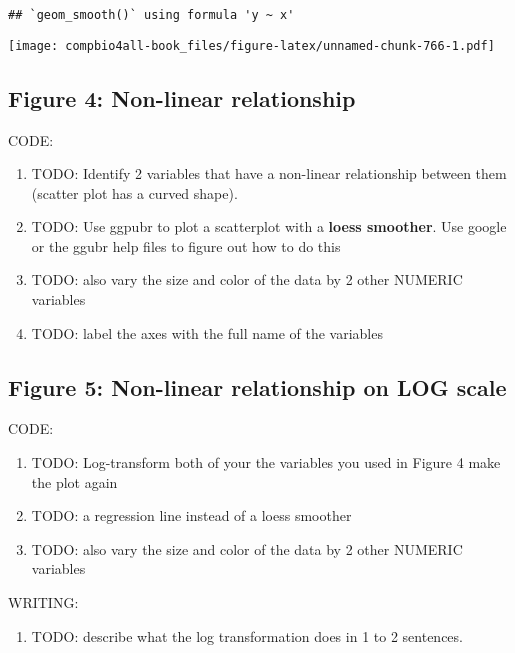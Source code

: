 \documentclass[
]{book}
\providecommand{\tightlist}{%
  \setlength{\itemsep}{0pt}\setlength{\parskip}{0pt}}
\begin{document}
\begin{verbatim}
## `geom_smooth()` using formula 'y ~ x'
\end{verbatim}

\texttt{[image: compbio4all-book\_files/figure-latex/unnamed-chunk-766-1.pdf]}

\hypertarget{figure-4-non-linear-relationship}{%
\subsection{Figure 4: Non-linear relationship}\label{figure-4-non-linear-relationship}}

CODE:

\begin{enumerate}
\def\labelenumi{\arabic{enumi}.}
\tightlist
\item
  TODO: Identify 2 variables that have a non-linear relationship between them (scatter plot has a curved shape).
\item
  TODO: Use ggpubr to plot a scatterplot with a \textbf{loess smoother}. Use google or the ggubr help files to figure out how to do this
\item
  TODO: also vary the size and color of the data by 2 other NUMERIC variables
\item
  TODO: label the axes with the full name of the variables
\end{enumerate}

\hypertarget{figure-5-non-linear-relationship-on-log-scale}{%
\subsection{Figure 5: Non-linear relationship on LOG scale}\label{figure-5-non-linear-relationship-on-log-scale}}

CODE:

\begin{enumerate}
\def\labelenumi{\arabic{enumi}.}
\tightlist
\item
  TODO: Log-transform both of your the variables you used in Figure 4 make the plot again
\item
  TODO: a regression line instead of a loess smoother
\item
  TODO: also vary the size and color of the data by 2 other NUMERIC variables
\end{enumerate}

WRITING:

\begin{enumerate}
\def\labelenumi{\arabic{enumi}.}
\tightlist
\item
  TODO: describe what the log transformation does in 1 to 2 sentences.
\end{enumerate}
\end{document}

